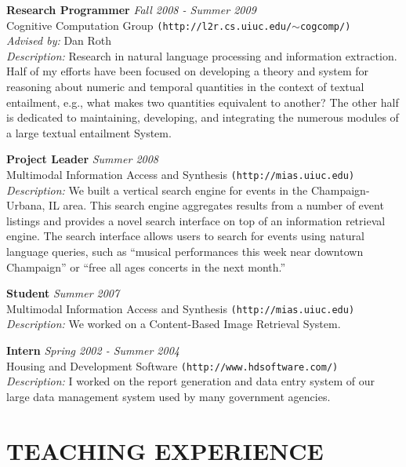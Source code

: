 \documentclass{report}
\begin{document}
{\bf Research Programmer} \hfill {\it Fall 2008 - Summer 2009} \\
Cognitive Computation Group \texttt{(http://l2r.cs.uiuc.edu/$\sim$cogcomp/)} \\
{\sl Advised by:} Dan Roth \\
{\sl Description:} Research in natural language processing and information extraction. Half of my efforts have been focused on developing a theory and system for reasoning about numeric and temporal quantities in the context of textual entailment, e.g., what makes two quantities equivalent to another? The other half is dedicated to maintaining, developing, and integrating the numerous modules of a large textual entailment System.

{\bf Project Leader} \hfill {\it Summer 2008} \\
Multimodal Information Access and Synthesis \texttt{(http://mias.uiuc.edu)} \\
{\sl Description:} We built a vertical search engine for events in the Champaign-Urbana, IL area. This search engine aggregates results from a number of event listings and provides a novel search interface on top of an information retrieval engine. The search interface allows users to search for events using natural language queries, such as ``musical performances this week near downtown Champaign'' or ``free all ages concerts in the next month.''

{\bf Student} \hfill {\it Summer 2007} \\
Multimodal Information Access and Synthesis \texttt{(http://mias.uiuc.edu)} \\
{\sl Description:} We worked on a Content-Based Image Retrieval System.				
				
{\bf Intern} \hfill {\it Spring 2002 - Summer 2004} \\
Housing and Development Software \texttt{(http://www.hdsoftware.com/)} \\
{\sl Description:} I worked on the report generation and data entry system of our large data management system used by many government agencies.


\section*{TEACHING EXPERIENCE} 
\end{document}
